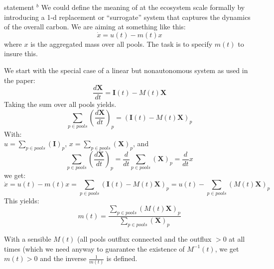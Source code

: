 \documentclass{article}
\newcommand{\cm}[1]{{\color{green} statement $^{#1}$} }
\newcommand{\X}{\mathbf{X}}
\newcommand{\I}{\mathbf{I}}
\begin{document}
\cm{b}
We could define the meaning of {\color{green} at the ecosystem scale} formally by introducing a 1-d replacement or ``surrogate'' system that captures the dynamics of the overall carbon.
We are aiming at something like this:
$$
\dot{x}=u(t)-m(t)x
$$ 
where $x$ is the aggregated mass over all pools.
The task is to specify $m(t)$ to insure this.

We start with the special case of a linear but nonautonomous system as used in the paper:
$$
\frac{d \X}{d t}= \I(t) - M(t) \X 
$$
Taking the sum over all pools yields.
$$
\sum_{p \in pools} \left( \frac{d \X}{d t} \right)_p
=
\left( \I(t) - M(t) \X \right)_p
$$
With:\\ 
$
u=\sum_{p \in pools} (\I)_p 
$,
$
x = \sum_{p \in pools} (\X)_p
$, and 
$$
\sum_{p \in pools} \left( \frac{d \X}{d t} \right)_p
=\frac{d}{d t}\sum_{p \in pools} (\mathbf X )_p
=\frac{d}{d t} x
$$ 
we get:
$$
\dot{x}
=u(t)-m(t) x 
=\sum_{p \in pools} \left( \I(t) - M(t) \X \right)_p
=u(t)-\sum_{p \in pools} ( M(t) \X )_p
$$
This yields: 
$$
m(t) = \frac{
    \sum_{p \in pools} ( M(t) \X )_p
    }{
    \sum_{p \in pools} (\X)_p
    }
$$

With a sensible $M(t)$ (all pools outflux connected and the outflux $>0$ at all times (which we need anyway to guarantee the existence of $M^{-1}(t)$, we get $m(t)>0$ and the inverse $\frac{1}{m(t)}$ is defined.\\
\end{document}
